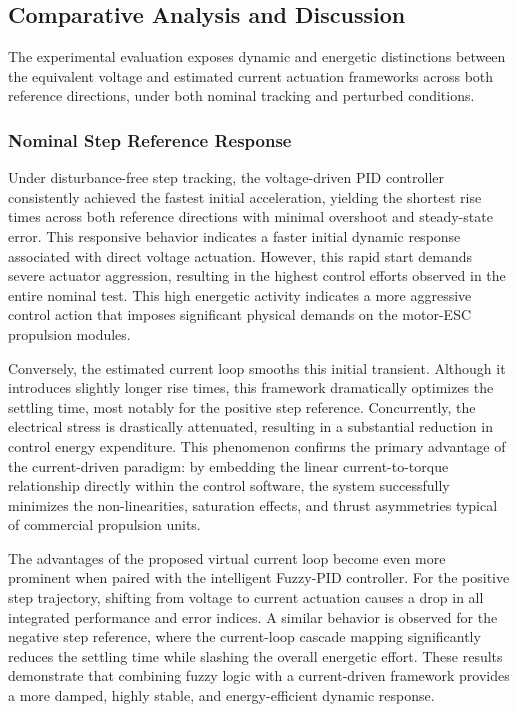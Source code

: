 \documentclass[pdflatex,sn-mathphys-num,iicol]{sn-jnl}
\theoremstyle{thmstyleone}%
\theoremstyle{thmstyletwo}%
\theoremstyle{thmstylethree}%
\begin{document}
\subsection{Comparative Analysis and Discussion}
\label{sub:comparative_discussion}

The experimental evaluation exposes dynamic and energetic distinctions between the equivalent voltage and estimated current actuation frameworks across both reference directions, under both nominal tracking and perturbed conditions.

\subsubsection{Nominal Step Reference Response}


Under disturbance-free step tracking, the voltage-driven PID controller consistently achieved the fastest initial acceleration, yielding the shortest rise times across both reference directions with minimal overshoot and steady-state error. This responsive behavior indicates a faster initial dynamic response associated with direct voltage actuation. However, this rapid start demands severe actuator aggression, resulting in the highest control efforts observed in the entire nominal test. This high energetic activity indicates a more aggressive control action that imposes significant physical demands on the motor-ESC propulsion modules.

Conversely, the estimated current loop smooths this initial transient. Although it introduces slightly longer rise times, this framework dramatically optimizes the settling time, most notably for the positive step reference. Concurrently, the electrical stress is drastically attenuated, resulting in a substantial reduction in control energy expenditure. This phenomenon confirms the primary advantage of the current-driven paradigm: by embedding the linear current-to-torque relationship directly within the control software, the system successfully minimizes the non-linearities, saturation effects, and thrust asymmetries typical of commercial propulsion units.

The advantages of the proposed virtual current loop become even more prominent when paired with the intelligent Fuzzy-PID controller. For the positive step trajectory, shifting from voltage to current actuation causes a drop in all integrated performance and error indices. A similar behavior is observed for the negative step reference, where the current-loop cascade mapping significantly reduces the settling time while slashing the overall energetic effort. These results demonstrate that combining fuzzy logic with a current-driven framework provides a more damped, highly stable, and energy-efficient dynamic response.
\end{document}

